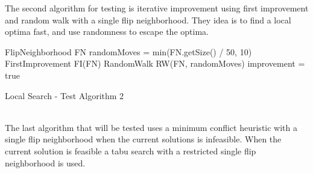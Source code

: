 The second algorithm for testing is iterative improvement using first improvement and random walk with a single flip 
neighborhood. They idea is to find a local optima fast, and use randomness to escape the optima.  \\ 
\IncMargin{1em}
\begin{algorithm}[H]

  \algdata

FlipNeighborhood FN \;
\int randomMoves = min(FN.getSize() / 50, 10) \;
FirstImprovement FI(FN) \;
RandomWalk RW(FN, randomMoves) \;
\bool improvement = true  \;
\caption{Local Search - Test Algorithm 2} \label{algo_LS2} 
\end{algorithm} \noindent
\DecMargin{1em} \\
The last algorithm that will be tested uses a minimum conflict heuristic with a single flip neighborhood when the 
current solutions is infeasible. When the current solution is feasible a tabu search with a restricted single flip 
neighborhood is used. \\ 

